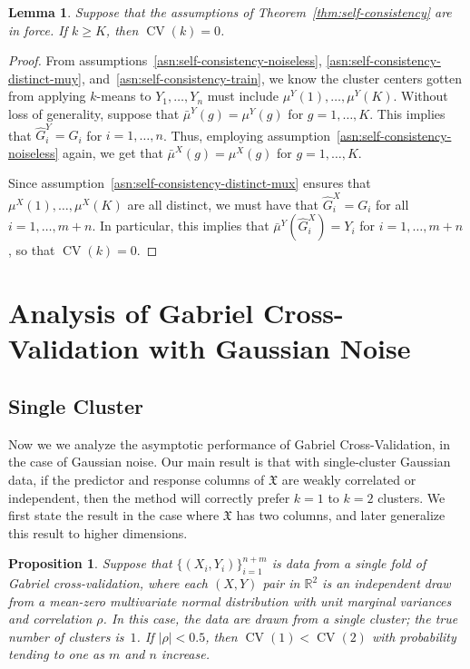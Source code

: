 \documentclass[12pt]{article}
\newtheorem{lemma}{Lemma}
\newtheorem{proposition}{Proposition}
\newcommand{\CV}{\operatorname{CV}}
\newcommand{\R}{\mathbb{R}}
\newcommand{\muX}{\mu^{X}}
\newcommand{\muY}{\mu^{Y}}
\newcommand{\bmuX}{\bar \mu^{X}}
\newcommand{\bmuY}{\bar \mu^{Y}}
\newcommand{\dataX}{\mathfrak{X}}
\newcommand{\hGX}{\hat G^{X}}
\newcommand{\hGY}{\hat G^{Y}}
\begin{document}
\begin{lemma}
Suppose that the assumptions of Theorem~\ref{thm:self-consistency} are in
force.  If $k \geq K$, then $\CV(k) = 0$.
\end{lemma}
\begin{proof}
From assumptions~\ref{asn:self-consistency-noiseless},
\ref{asn:self-consistency-distinct-muy},
and~\ref{asn:self-consistency-train}, we know the cluster centers
gotten from applying $k$-means to $Y_1, \dotsc, Y_n$ must include
$\muY(1), \dotsc, \muY(K)$.  Without loss of generality, suppose that
$\bmuY(g) = \muY(g)$ for $g = 1, \dotsc, K$.  This implies that
$\hGY_i = G_i$ for $i = 1, \dotsc, n$.  Thus, employing
assumption~\ref{asn:self-consistency-noiseless} again, we get that
$\bmuX(g) = \muX(g)$ for $g = 1, \dotsc, K$.


Since assumption~\ref{asn:self-consistency-distinct-mux} ensures that
$\muX(1), \dotsc, \muX(K)$ are all distinct, we must have that $\hGX_i = G_i$
for all $i = 1, \dotsc, m+n$.  In particular, this implies that $\bmuY(\hGX_i)
= Y_i$ for $i = 1, \dotsc, m+n$, so that $\CV(k) = 0$.
\end{proof}
\section{Analysis of Gabriel Cross-Validation with Gaussian Noise}

\subsection{Single Cluster}
Now we we analyze the asymptotic performance of Gabriel Cross-Validation, in
the case of Gaussian noise. Our main result is that with single-cluster
Gaussian data, if the predictor and response columns of $\dataX$ are weakly
correlated or independent, then the method will correctly prefer $k = 1$ to
$k = 2$ clusters. We first state the result in the case where $\dataX$ has two 
columns, and later generalize this result to higher dimensions.

\begin{proposition}
Suppose that $\{ (X_i, Y_i) \}_{i=1}^{n + m}$ is data from a single fold
of Gabriel cross-validation, where each $(X,Y)$ pair in $\R^2$ is an
independent draw from a mean-zero multivariate normal distribution with unit
marginal variances and correlation $\rho$.  In this case, the data are drawn
from a single cluster; the true number of clusters is~$1$.  If $|\rho| < 0.5$,
then $\CV(1) < \CV(2)$ with probability tending to one as $m$ and $n$ increase.
\end{proposition}
\end{document}
